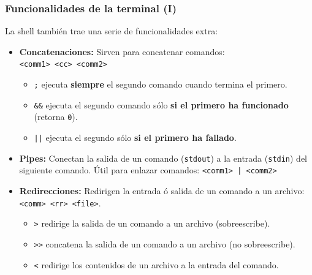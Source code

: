 \documentclass[aspectratio=43]{beamer}
\begin{document}
\begin{frame}
    \frametitle{Funcionalidades de la terminal (I)}
    La shell también trae una serie de funcionalidades extra:

    \begin{itemize}
        \item \textbf{Concatenaciones:} Sirven para concatenar comandos:\\
        \texttt{<comm1> <cc> <comm2>}\\
        \begin{itemize}
            \item \texttt{;} ejecuta \textbf{siempre} el segundo comando cuando termina el primero.
            \item \texttt{\&\&} ejecuta el segundo comando sólo \textbf{si el primero ha funcionado} (retorna \texttt{0}).
            \item \texttt{||} ejecuta el segundo sólo \textbf{si el primero ha fallado}.
        \end{itemize}
        \item \textbf{Pipes:} Conectan la salida de un comando (\texttt{stdout}) a la entrada (\texttt{stdin}) del siguiente comando. Útil para enlazar comandos: \texttt{<comm1> | <comm2>}\\
        \item \textbf{Redirecciones:} Redirigen la entrada ó salida de un comando a un archivo: \texttt{<comm> <rr> <file>}.
        \begin{itemize}
            \item \texttt{>} redirige la salida de un comando a un archivo (sobreescribe).
            \item \texttt{>>} concatena la salida de un comando a un archivo (no sobreescribe).
            \item \texttt{<} redirige los contenidos de un archivo a la entrada del comando.
        \end{itemize} 

    \end{itemize}

\end{frame}
\end{document}
